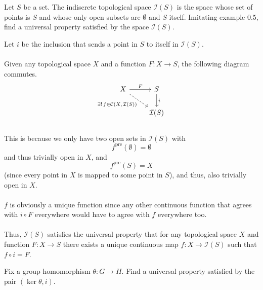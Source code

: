 \documentclass[letterpaper, 12pt]{hmcpset}
\begin{document}
\begin{problem}[0.10]
	Let $S$ be a set. The indiscrete topological space $\mathcal I(S)$ is the space whose set of points is $S$ and whose only open subsets are $\emptyset$ and $S$ itself. Imitating example 0.5, find a universal property satisfied by the space $\mathcal I(S)$.
\end{problem}

\begin{solution}
	Let $i$ be the inclusion that sends a point in $S$ to itself in $\mathcal I(S)$.\\\\
	Given any topological space $X$ and a function $F : X \to S$, the following diagram commutes.
	\[
		\begin{tikzcd}
			X \arrow[r, "F"] \arrow[rd, dashrightarrow, "\exists ! \, f \in \mathcal C({X, \, \mathcal I(S)})"']
			& S \arrow[d, "i"] \\
			& \mathcal I(S)
		\end{tikzcd}
	\]\\
	This is because we only have two open sets in $\mathcal I(S)$ with
	\[
		f^\text{pre}(\emptyset) = \emptyset
	\]
	and thus trivially open in $X$, and
	\[
		f^\text{pre}(S) = X
	\]
	(since every point in $X$ is mapped to some point in $S$), and thus, also trivially open in $X$.\\\\
	$f$ is obviously a unique function since any other continuous function that agrees with $i \circ F$ everywhere would have to agree with $f$ everywhere too. \\\\
	Thus, $\mathcal I(S)$ satisfies the universal property that for any topological space $X$ and function $F : X \to S$ there exists a unique continuous map $f : X \to \mathcal I(S)$ such that $f \circ i = F$.
\end{solution}

\pagebreak

\begin{problem}[0.11]
	Fix a group homomorphism $\theta : G \to H$. Find a universal property satisfied by the pair $(\ker \theta, i)$.
\end{problem}
\end{document}
